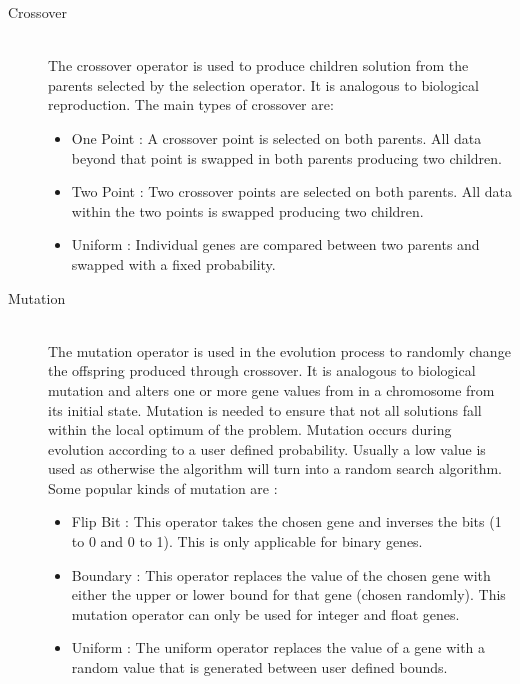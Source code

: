 \begin{description}
  \item[Crossover] \hfill \\
  	The crossover operator is used to produce children solution from the parents selected by the selection operator. It is analogous to biological reproduction. The main types of crossover are: 
	\begin{itemize}
	\item One Point : A crossover point is selected on both parents. All data beyond that point is swapped in both parents producing two children. 
	\item Two Point : Two crossover points are selected on both parents. All data within the two points is swapped producing two children.
	\item Uniform : Individual genes are compared between two parents and swapped with a fixed probability. 
	\end{itemize}
  \item[Mutation] \hfill \\
  	The mutation operator is used in the evolution process to randomly change the offspring produced through crossover. It is analogous to biological mutation and alters one or more gene values from in a chromosome from its initial state. Mutation is needed to ensure that not all solutions fall within the local optimum of the problem. Mutation occurs during evolution according to a user defined probability. Usually a low value is used as otherwise the algorithm will turn into a random search algorithm.
	Some popular kinds of mutation are :
	\begin{itemize}
	\item Flip Bit : This operator takes the chosen gene and inverses the bits (1 to 0 and 0 to 1). This is only applicable for binary genes.
	\item Boundary : This operator replaces the value of the chosen gene with either the upper or lower bound for that gene (chosen randomly). This mutation operator can only be used for integer and float genes.
	\item Uniform :  The uniform operator replaces the value of a gene with a random value that is generated between user defined bounds.
\end{itemize}
\end{description}

